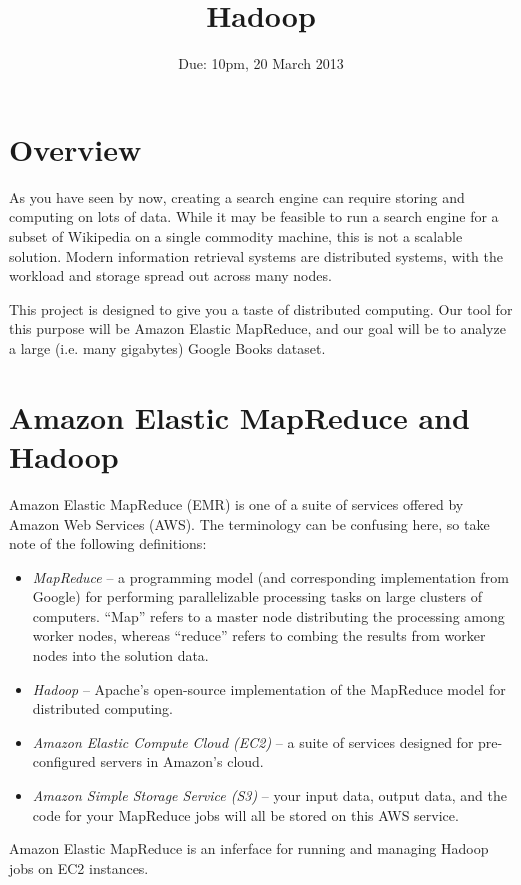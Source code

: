 \documentclass[10pt]{article}
\begin{document}
\title{\vspace{-15mm}{\small Brown~University --- CSCI~1580 --- Spring~2013}\\Hadoop}
\author{Due: 10pm, 20 March 2013}
\date{}
\maketitle
\pagestyle{plain}
\thispagestyle{empty}

\section*{Overview}

As you have seen by now, creating a search engine can require storing and
computing on lots of data. While it may be feasible to run a search
engine for a subset of Wikipedia on a single commodity machine, this
is not a scalable solution. Modern information retrieval systems are
distributed systems, with the workload and storage spread out across many
nodes.

This project is designed to give you a taste of distributed computing.
Our tool for this purpose will be Amazon Elastic MapReduce, and our goal
will be to analyze a large (i.e. many gigabytes) Google Books dataset. 

\section{Amazon Elastic MapReduce and Hadoop}

Amazon Elastic MapReduce (EMR) is one of a suite of services offered by Amazon Web Services (AWS).
The terminology can be confusing here, so take note of the following definitions:
\begin{itemize}
\item \textit{MapReduce} -- a programming model (and corresponding implementation from
Google) for performing parallelizable processing tasks on large clusters of computers. ``Map''
refers to a master node distributing the processing among worker nodes, whereas ``reduce'' refers
to combing the results from worker nodes into the solution data.
\item \textit{Hadoop} -- Apache's open-source implementation of the MapReduce model for distributed
computing.
\item \textit{Amazon Elastic Compute Cloud (EC2)} -- a suite of services designed for
pre-configured servers in Amazon's cloud.
\item \textit{Amazon Simple Storage Service (S3)} -- your input data, output data, and the code
for your MapReduce jobs will all be stored on this AWS service.
\end{itemize}
Amazon Elastic MapReduce is an inferface for running and managing Hadoop jobs on EC2 instances.
\end{document}
